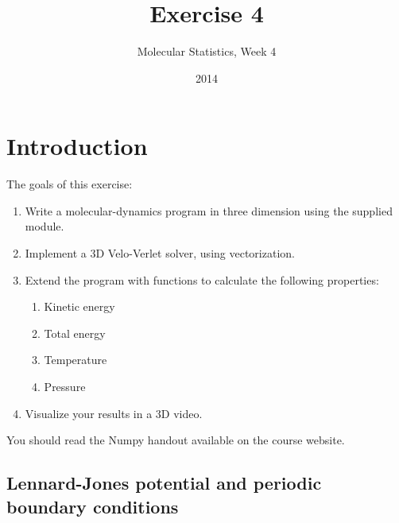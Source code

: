 \documentclass{article}
\title{Exercise 4}
\author{Molecular Statistics, Week 4}
\date{2014}
\begin{document}

\maketitle

\section{Introduction}

The goals of this exercise:
\begin{enumerate}
    \item Write a molecular-dynamics program in three dimension using the supplied module.

    \item Implement a 3D Velo-Verlet solver, using vectorization.

    \item Extend the program with functions to calculate the following properties:

    \begin{enumerate}
        \item Kinetic energy
        \item Total energy
        \item Temperature
        \item Pressure
    \end{enumerate}

    \item Visualize your results in a 3D video.

\end{enumerate}

You should read the Numpy handout available on the course website.

\subsection{Lennard-Jones potential and periodic boundary conditions}
\end{document}
